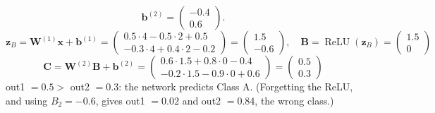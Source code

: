 \documentclass[11pt,addpoints]{exam}
\begin{document}
\begin{questions}
\begin{parts}
\begin{solution}
\[\bm{b}^{(2)} = \begin{pmatrix} -0.4 \\ 0.6 \end{pmatrix}.
\]
\[
\bm{z}_B = \bm{W}^{(1)} \bm{x} + \bm{b}^{(1)}
= \begin{pmatrix} 0.5 \cdot 4 - 0.5 \cdot 2 + 0.5 \\ -0.3 \cdot 4 + 0.4 \cdot 2 - 0.2 \end{pmatrix}
= \begin{pmatrix} 1.5 \\ -0.6 \end{pmatrix}, \quad
\bm{B} = \operatorname{ReLU}(\bm{z}_B) = \begin{pmatrix} 1.5 \\ 0 \end{pmatrix}
\]
\[
\bm{C} = \bm{W}^{(2)} \bm{B} + \bm{b}^{(2)}
= \begin{pmatrix} 0.6 \cdot 1.5 + 0.8 \cdot 0 - 0.4 \\ -0.2 \cdot 1.5 - 0.9 \cdot 0 + 0.6 \end{pmatrix}
= \begin{pmatrix} 0.5 \\ 0.3 \end{pmatrix}
\]
out1 $= 0.5 >$ out2 $= 0.3$: the network predicts Class A. (Forgetting the ReLU, and using
$B_2 = -0.6$, gives out1 $= 0.02$ and out2 $= 0.84$, the wrong class.)
\end{solution}

\newpage

\end{parts}
\end{questions}
\end{document}
